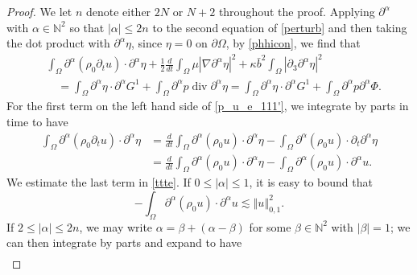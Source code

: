 \documentclass[a4paper,reqno,11pt]{amsart}
\numberwithin{equation}{section}
\providecommand{\abs}[1]{\left\vert#1\right\vert}
\providecommand{\norm}[1]{\left\Vert#1\right\Vert}
\providecommand{\norm}[1]{\left\Vert#1\right\Vert}
\begin{document}
\begin{proof}
We let $n$ denote either $2N$ or $N+2$ throughout the proof.
Applying $\partial^\alpha$ with ${\alpha}\in \mathbb{N}^{2}$ so that $ |{\alpha}|\le 2n$ to the second equation of \eqref{perturb} and then taking the dot product with ${\partial}^{\alpha} \eta$, since $\eta=0$ on ${\partial}\Omega$, by \eqref{phhicon}, we find that
\begin{equation} \label{p_u_e_111'}
\begin{split}
 &\int_\Omega \partial^\alpha ( \rho_0 {\partial_t}    u) \cdot \partial^\alpha \eta
  +\frac{1}{2}\frac{d}{dt} \int_\Omega  \mu    \abs{\nabla  {\partial}^{\alpha}  \eta}^2  +\kappa\bar b^2\int_{\Omega}  \abs{{\partial}_3\partial^\alpha  \eta }^2
 \\&\quad=  \int_\Omega   {\partial}^{\alpha} \eta  \cdot  {\partial}^{\alpha} G^1 +\int_\Omega   {\partial}^{\alpha} p  \operatorname{div} {\partial}^{\alpha} \eta=  \int_\Omega   {\partial}^{\alpha} \eta  \cdot  {\partial}^{\alpha} G^1 +\int_\Omega   {\partial}^{\alpha} p  {\partial}^{\alpha} \Phi.
\end{split}
\end{equation}
For the first term on the left hand side of \eqref{p_u_e_111'}, we integrate by parts in time to have
\begin{equation}\label{ttte}
\begin{split}
\int_\Omega  \partial^\alpha ( \rho_0 {\partial_t}    u) \cdot \partial^\alpha \eta&=\frac{d}{dt}\int_\Omega  \partial^\alpha ( \rho_0      u) \cdot   \partial^\alpha  \eta-\int_\Omega   \partial^\alpha ( \rho_0      u) \cdot {\partial_t} \partial^\alpha  \eta\\&=\frac{d}{dt}\int_\Omega  \partial^\alpha ( \rho_0      u) \cdot   \partial^\alpha  \eta-\int_\Omega   \partial^\alpha ( \rho_0      u) \cdot   \partial^\alpha  u.
\end{split}
\end{equation}
We estimate the last term in \eqref{ttte}. If $0\le \abs{\alpha}\le1$,  it is easy to bound that
\begin{equation}\label{eeee}
 -\int_\Omega  \partial^\alpha ( \rho_0      u) \cdot   \partial^\alpha  u{\lesssim} \norm{ u}_{0,1}^2.
\end{equation}
If $2\le\abs{\alpha}\le 2n$, we may write $\alpha = \beta +(\alpha-\beta)$ for some $\beta \in \mathbb{N}^2$ with $\abs{\beta}=1$; we can then integrate by parts and expand to have
\begin{equation}
\begin{split}

\end{split}
\end{equation}
\end{proof}
\end{document}
